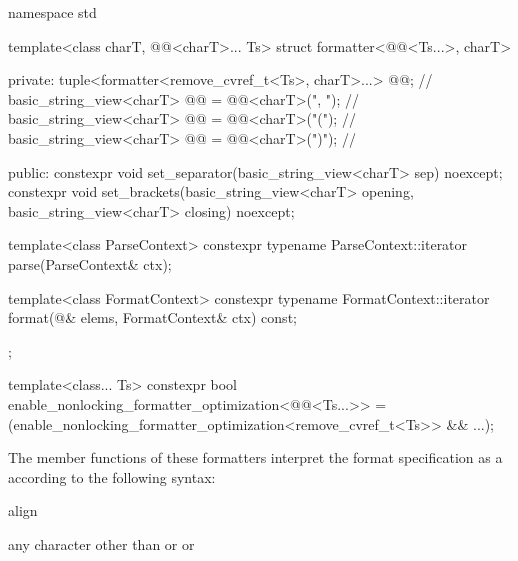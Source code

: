 %
\begin{codeblock}
namespace std {
  template<class charT, @@<charT>... Ts>
  struct formatter<@@<Ts...>, charT> {
  private:
    tuple<formatter<remove_cvref_t<Ts>, charT>...> @@;               // \expos
    basic_string_view<charT> @@ = @@<charT>(", ");      // \expos
    basic_string_view<charT> @@ = @@<charT>("("); // \expos
    basic_string_view<charT> @@ = @@<charT>(")"); // \expos

  public:
    constexpr void set_separator(basic_string_view<charT> sep) noexcept;
    constexpr void set_brackets(basic_string_view<charT> opening,
                                basic_string_view<charT> closing) noexcept;

    template<class ParseContext>
      constexpr typename ParseContext::iterator
        parse(ParseContext& ctx);

    template<class FormatContext>
      constexpr typename FormatContext::iterator
        format(@\seebelow@& elems, FormatContext& ctx) const;
  };

  template<class... Ts>
    constexpr bool enable_nonlocking_formatter_optimization<@@<Ts...>> =
      (enable_nonlocking_formatter_optimization<remove_cvref_t<Ts>> && ...);
}
\end{codeblock}

\pnum
The  member functions of these formatters
interpret the format specification as
a  according to the following syntax:

\begin{ncbnf}
\br
      
\end{ncbnf}

\begin{ncbnf}
\br
     align
\end{ncbnf}

\begin{ncbnf}
\br
    \textnormal{any character other than} \terminal{\{} \textnormal{or} \terminal{\}} \textnormal{or} \terminal{:}
\end{ncbnf}

